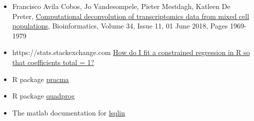 \documentclass[11pt, fleqn]{article}
\begin{document}
\begin{itemize}
    \item Francisco Avila Cobos, Jo Vandesompele, Pieter Mestdagh, Katleen De
        Preter, \href{https://doi.org/10.1093/bioinformatics/bty019}{Computational deconvolution of transcriptomics data from mixed
        cell populations}, Bioinformatics, Volume 34, Issue 11, 01 June 2018,
        Pages 1969-1979

    \item https://stats.stackexchange.com
        \href{https://stats.stackexchange.com/questions/21565/how-do-i-fit-a-constrained-regression-in-r-so-that-coefficients-total-1}{How
        do I fit a constrained regression in R so that coefficients total = 1?}

    \item R package \href{https://CRAN.R-project.org/package=pracma}{pracma} 
        
    \item R package \href{https://CRAN.R-project.org/package=quadprog}{quadprog}

    \item The matlab documentation for \href{https://uk.mathworks.com/help/optim/ug/lsqlin.html}{lsqlin}

\end{itemize}
\end{document}
